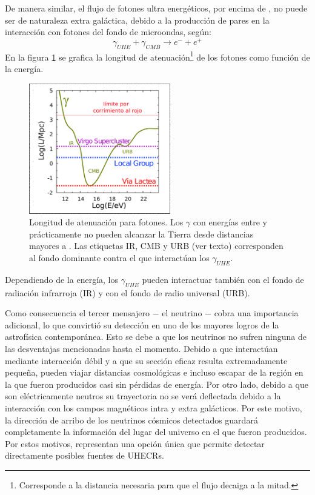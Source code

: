 De manera similar, el flujo de fotones ultra energ\'eticos, por encima de , no puede ser de naturaleza extra gal\'actica, debido a la producci\'on de pares en la interacci\'on con fotones del fondo de microondas, seg\'un\cite{cite:photonInt1,cite:photonInt2}:
%
\begin{equation}
\gamma_{UHE} + \gamma_{CMB} \rightarrow e^- + e^+
\end{equation}
%
En la figura \ref{fig:photProp} se grafica la longitud de atenuaci\'on\footnote{Corresponde a la distancia necesaria para que el flujo decaiga a la mitad.} de los fotones como funci\'on de la energ\'ia.
%
\begin{figure}[ht]
	\begin{center}
	\includegraphics[width=0.55\textwidth]{fig/introduccion/photon_propaga_espanol}
	\caption{\label{fig:photProp} Longitud de atenuaci\'on para fotones. Los $\gamma$ con energ\'ias entre  y  pr\'acticamente no pueden alcanzar la Tierra desde distancias mayores a . Las etiquetas IR, CMB y URB (ver texto) corresponden al fondo dominante contra el que interact\'uan los $\gamma_{UHE}$.}
	\end{center}
\end{figure}
%
Dependiendo de la energ\'ia, los $\gamma_{UHE}$ pueden interactuar tambi\'en con el fondo de radiaci\'on infrarroja (IR)\cite{cite:IR} y con el fondo de radio universal (URB)\cite{cite:URB}.

Como consecuencia el tercer mensajero $-$ el neutrino $-$ cobra una importancia adicional, lo que convirti\'o su detecci\'on en uno de los mayores logros de la astrof\'isica contempor\'anea.
Esto se debe a que los neutrinos no sufren ninguna de las desventajas mencionadas hasta el momento. 
Debido a que interact\'uan mediante interacci\'on d\'ebil y a que su secci\'on eficaz resulta extremadamente peque\~na, pueden viajar distancias cosmol\'ogicas e incluso escapar de la regi\'on en la que fueron producidos casi sin p\'erdidas de energ\'ia.
Por otro lado, debido a que son el\'ectricamente neutros su trayectoria no se ver\'a deflectada debido a la interacci\'on con los campos magn\'eticos intra y extra gal\'acticos.
Por este motivo, la direcci\'on de arribo de los neutrinos c\'osmicos detectados guardar\'a completamente la informaci\'on del lugar del universo en el que fueron producidos.
Por estos motivos, representan una opci\'on \'unica que permite detectar directamente posibles fuentes de UHECRs.

